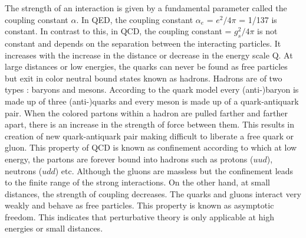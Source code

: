 The strength of an interaction is given by a fundamental parameter called the coupling constant $\alpha$. In QED, the coupling constant $\alpha_e$ = $e^2/4\pi$ = 1/137 is constant. In contrast to this, in QCD, the coupling constant \alpsq = $g^2_s/4\pi$ is not constant and depends on the separation between the interacting particles. It increases with the increase in the distance or decrease in the energy scale Q. At large distances or low energies, the quarks can never be found as free particles but exit in color neutral bound states known as hadrons. Hadrons are of two types : baryons and mesons. According to the quark model \cite{Griffiths:111880} every (anti-)baryon is made up of three (anti-)quarks and every meson is made up of a quark-antiquark pair. When the colored partons within a hadron are pulled farther and farther apart, there is an increase in the strength of force between them. This results in creation of new quark-antiquark pair making difficult to liberate a free quark or gluon. This property of QCD is known as confinement according to which at low energy, the partons are forever bound into hadrons such as protons ($uud$), neutrons ($udd$) etc. Although the gluons are massless but the confinement leads to the finite range of the strong interactions. On the other hand, at small distances, the strength of coupling decreases. The quarks and gluons interact very weakly and behave as free particles. This property is known as asymptotic freedom. This indicates that perturbative theory is only applicable at high energies or small distances.

